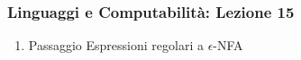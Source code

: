




\begin{frame}[fragile]
	\frametitle{Linguaggi e Computabilità: Lezione 15}
\begin{enumerate}
\item
Passaggio Espressioni regolari a $\epsilon$-NFA
\end{enumerate}
\end{frame}



